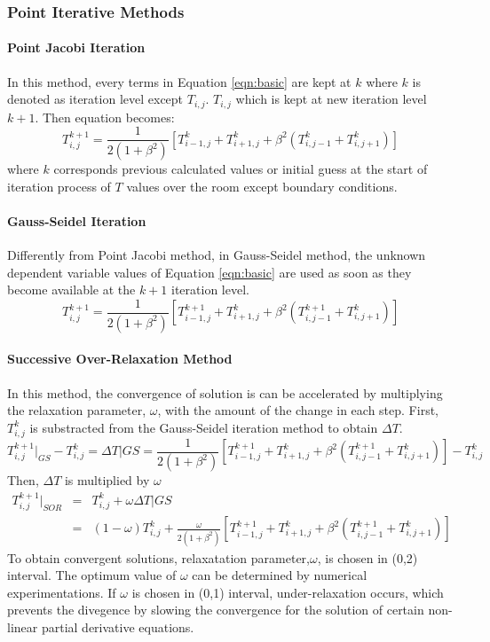 \documentclass[letterpaper,12pt]{article}
\begin{document}
\subsubsection{Point Iterative Methods}
\paragraph{Point Jacobi Iteration}
In this method, every terms in Equation \ref{eqn:basic} are kept at $k$
where $k$ is denoted as iteration level except $T_{i,j}$. $T_{i,j}$ which is kept
at new iteration level $k+1$. Then equation becomes:
\begin{equation}
	T_{i,j}^{k+1}=\frac{1}{2(1+\beta^2)}[T_{i-1,j}^{k}+T_{i+1,j}^{k}+\beta ^2(T_{i,j-1}^{k}+T_{i,j+1}^{k})]
\label{eqn:jacobi}
\end{equation}
where $k$ corresponds previous calculated values or initial guess at the start
of iteration process of $T$ values over the room except boundary conditions.
\paragraph{Gauss-Seidel Iteration}
Differently from Point Jacobi method, in Gauss-Seidel method, the unknown dependent
variable values of Equation \ref{eqn:basic} are used as soon as they become available
at the $k+1$ iteration level.
\begin{equation}
	T_{i,j}^{k+1}=\frac{1}{2(1+\beta^2)}[T_{i-1,j}^{k+1}+T_{i+1,j}^{k}+\beta ^2(T_{i,j-1}^{k+1}+T_{i,j+1}^{k})]
\label{eqn:gs}
\end{equation}
\paragraph{Successive Over-Relaxation Method}
In this method, the convergence of solution is can be accelerated by multiplying the relaxation
parameter, $\omega$, with the amount of the change in each step. First, $T_{i,j}^k$ is substracted
from the Gauss-Seidel iteration method to obtain $\Delta T$.
\begin{equation}
	T_{i,j}^{k+1}\vert_{GS}-T_{i,j}^{k}=\Delta T\vert{GS}=\frac{1}{2(1+\beta^2)}[T_{i-1,j}^{k+1}+T_{i+1,j}^{k}+\beta ^2(T_{i,j-1}^{k+1}+T_{i,j+1}^{k})]-T_{i,j}^{k}
\label{eqn:sor1}
\end{equation}
Then, $\Delta T$ is multiplied by $\omega$
\begin{eqnarray}
	T_{i,j}^{k+1}\vert_{SOR}&=&T_{i,j}^{k}+\omega\Delta T\vert{GS} \nonumber \\
	&=&(1-\omega)T_{i,j}^{k}+\frac{\omega}{2(1+\beta^2)}[T_{i-1,j}^{k+1}+T_{i+1,j}^{k}+\beta^2(T_{i,j-1}^{k+1}+T_{i,j+1}^{k})]
	\label{eqn:sor}
\end{eqnarray}
To obtain convergent solutions, relaxatation parameter,$\omega$, is chosen in (0,2) interval.
The optimum value of $\omega$ can be determined by numerical experimentations. If $\omega$ is chosen in
(0,1) interval, under-relaxation occurs, which prevents the divegence by slowing the convergence for the solution of
certain non-linear partial derivative equations.
\end{document}
